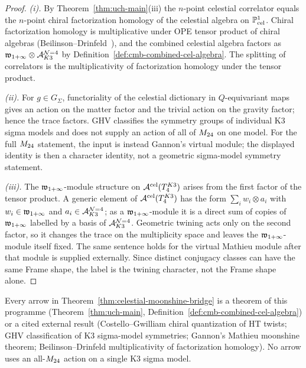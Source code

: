 \begin{proof}
\emph{(i).}
By Theorem~\ref{thm:uch-main}(iii) the $n$-point celestial correlator
equals the $n$-point chiral factorization homology of the celestial
algebra on $\mathbb P^1_{\mathrm{cel}}$. Chiral factorization homology is
multiplicative under OPE tensor product of chiral algebras
(Beilinson--Drinfeld~\cite[\S 3.4]{BeilinsonDrinfeldChiral}), and the
combined celestial algebra factors as $\mathfrak w_{1+\infty} \otimes
\mathcal A^{\mathcal{N}{=}4}_{K3}$ by
Definition~\ref{def:cmb-combined-cel-algebra}. The splitting of
correlators is the multiplicativity of factorization homology under the
tensor product.

\emph{(ii).}
For \(g\in G_\Sigma\), functoriality of the celestial dictionary in
\(Q\)-equivariant maps gives an action on the matter factor and the
trivial action on the gravity factor; hence the trace factors. GHV
classifies the symmetry groups of individual K3 sigma models and does
not supply an action of all of \(M_{24}\) on one model. For the full
\(M_{24}\) statement, the input is instead Gannon's virtual module;
the displayed identity is then a character identity, not a geometric
sigma-model symmetry statement.

\emph{(iii).}
The $\mathfrak w_{1+\infty}$-module structure on $\mathcal A^{\mathrm{cel}}(T_4^{K3})$ arises from the
first factor of the tensor product. A generic element of
$\mathcal A^{\mathrm{cel}}(T_4^{K3})$ has the form $\sum_i w_i \otimes a_i$ with $w_i \in
\mathfrak w_{1+\infty}$ and $a_i \in \mathcal A^{\mathcal{N}{=}4}_{K3}$; as a $\mathfrak w_{1+\infty}$-module it
is a direct sum of copies of $\mathfrak w_{1+\infty}$ labelled by a basis of
$\mathcal A^{\mathcal{N}{=}4}_{K3}$. Geometric twining acts only on the second
factor, so it changes the trace on the multiplicity space and leaves
the $\mathfrak w_{1+\infty}$-module itself fixed. The same sentence holds for the virtual
Mathieu module after that module is supplied externally. Since distinct
conjugacy classes can have the same Frame shape, the label is the
twining character, not the Frame shape alone.
\end{proof}

\begin{remark}
\label{rem:cmb-construction-not-narration}
Every arrow in Theorem~\ref{thm:celestial-moonshine-bridge} is a theorem
of this programme
(Theorem~\ref{thm:uch-main}, Definition~\ref{def:cmb-combined-cel-algebra})
or a cited external result (Costello--Gwilliam chiral quantization of
HT twists; GHV classification of K3 sigma-model symmetries; Gannon's
Mathieu moonshine theorem; Beilinson--Drinfeld multiplicativity of
factorization homology). No arrow uses an all-\(M_{24}\) action on a
single K3 sigma model.
\end{remark}

